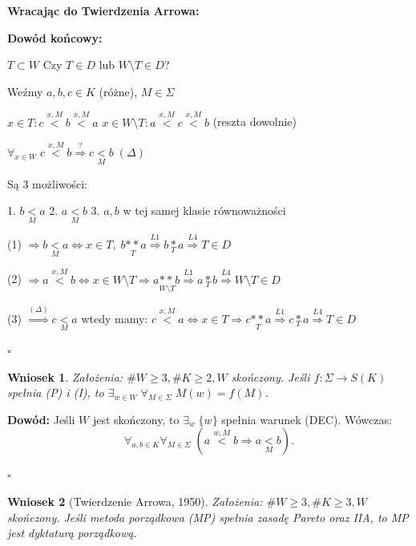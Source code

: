 \documentclass[12pt,a4paper]{article}
\theoremstyle{break}
\newtheorem{wniosek}{Wniosek}[theorem]
\begin{document}
	\textbf{Wracając do Twierdzenia Arrowa:}  
	
	\noindent \textbf{Dowód końcowy:}  
	
	$T\subset W$ Czy $T \in D$ lub $W\setminus T \in D$?  
	
	Weźmy $a,b,c\in K$ (różne), $M\in \Sigma$  
	
	$x \in T : c\overset{x,M}{<}b\overset{x,M}{<}a$  
	$x\in W\setminus T : a\overset{x,M}{<}c\overset{x,M}{<}b$ (reszta dowolnie)  
	
	$\forall_{x\in W} \; c\overset{x,M}{<}b \overset{?}{\Rightarrow} c \underset{M}{<}b \; (\Delta)$  
	
	Są 3 możliwości:  
	
	1. $b\underset{M}{<}a$  
	2. $a\underset{M}{<}b$  
	3. $a,b$ w tej samej klasie równoważności  
	
	(1) $\Rightarrow b\underset{M}{<}a \Leftrightarrow x\in T, \; b\underset{T}{**}a \overset{L1}{\Rightarrow} b\underset{T}{*}a \overset{L4}{\Rightarrow} T\in D$  
	
	(2) $\Rightarrow a\overset{x,M}{<}b \Leftrightarrow x\in W\setminus T \Rightarrow a\underset{W\setminus T}{**}b \overset{L1}{\Rightarrow} a\underset{T}{*}b \overset{L4}{\Rightarrow} W\setminus T \in D$  
	
	(3) $\overset{(\Delta)}{\Rightarrow} c\underset{M}{<}a$ wtedy mamy:  
	$c\overset{x,M}{<}a \Leftrightarrow x\in T \Rightarrow c\underset{T}{**}a \overset{L1}{\Rightarrow} c\underset{T}{*}a \overset{L4}{\Rightarrow} T\in D$  
	
	\begin{flushright}
		$\square$
	\end{flushright}
	
	\begin{wniosek}
		Założenia: $\# W \geq 3, \# K \geq 2, W$ skończony.  
		Jeśli $f : \Sigma \to S(K)$ spełnia (P) i (I), to $\exists_{w \in W} \; \forall_{M \in \Sigma} \; M(w) = f(M)$.
	\end{wniosek}
	
	\noindent \textbf{Dowód:} Jeśli $W$ jest skończony, to $\exists_w \; \{w\}$ spełnia warunek (DEC).  
	Wówczas:
	\[
	\forall_{a, b \in K} \forall_{M \in \Sigma} \; (a \overset{w, M}{<} b \Rightarrow a \underset{M}{<} b).
	\]
	\begin{flushright}
		$\square$
	\end{flushright}
	
	\begin{wniosek}[Twierdzenie Arrowa, 1950]
		Założenia: $\# W \geq 3, \# K \geq 3, W$ skończony.  
		Jeśli metoda porządkowa (MP) spełnia zasadę Pareto oraz IIA, to MP jest dyktaturą porządkową.
	\end{wniosek}
	
\end{document}
